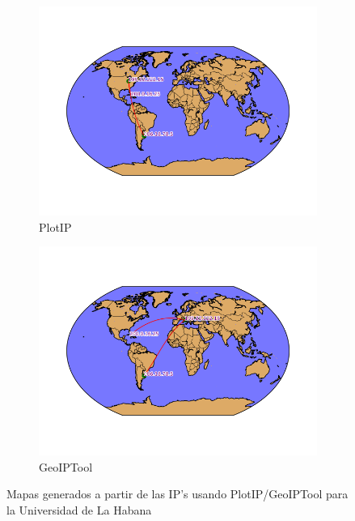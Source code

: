 \begin{figure}[ht]
	\begin{subfigure}[b]{0.5\textwidth}
		\centering
		\includegraphics[width=\linewidth]{imagenes/mapa_habana_plotip.png}
		\caption{PlotIP}
	\end{subfigure} 
	\begin{subfigure}[b]{0.5\textwidth}
		\centering
		\includegraphics[width=\linewidth]{imagenes/mapa_habana_geoip.png}
		\caption{GeoIPTool}
	\end{subfigure} 
	\caption{Mapas generados a partir de las IP's usando PlotIP/GeoIPTool para la Universidad de La Habana}
\end{figure}

\clearpage
